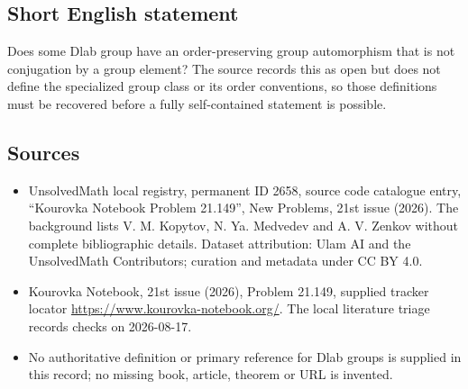 \documentclass[11pt]{article}
\begin{document}
\subsection{Short English statement}
Does some Dlab group have an order-preserving group automorphism that is not conjugation by a group element? The source records this as open but does not define the specialized group class or its order conventions, so those definitions must be recovered before a fully self-contained statement is possible.
\subsection{Sources}
\begin{itemize}
\item UnsolvedMath local registry, permanent ID 2658, source code catalogue entry, ``Kourovka Notebook Problem 21.149'', New Problems, 21st issue (2026). The background lists V. M. Kopytov, N. Ya. Medvedev and A. V. Zenkov without complete bibliographic details. Dataset attribution: Ulam AI and the UnsolvedMath Contributors; curation and metadata under CC BY 4.0.
\item Kourovka Notebook, 21st issue (2026), Problem 21.149, supplied tracker locator \url{https://www.kourovka-notebook.org/}. The local literature triage records checks on 2026-08-17.
\item No authoritative definition or primary reference for Dlab groups is supplied in this record; no missing book, article, theorem or URL is invented.
\end{itemize}
\end{document}
